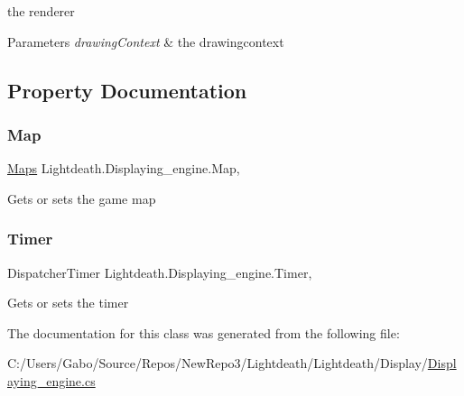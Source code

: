the renderer 


\begin{DoxyParams}{Parameters}
{\em drawing\+Context} & the drawingcontext\\
\hline
\end{DoxyParams}


\subsection{Property Documentation}
\hypertarget{class_lightdeath_1_1_displaying__engine_a914b56713dcb4b219b2f18c584c09df2}{}\label{class_lightdeath_1_1_displaying__engine_a914b56713dcb4b219b2f18c584c09df2} 
\subsubsection{\texorpdfstring{Map}{Map}}
{\footnotesize\ttfamily \hyperlink{class_lightdeath_1_1_maps}{Maps} Lightdeath.\+Displaying\+\_\+engine.\+Map\hspace{0.3cm}{\ttfamily [get]}, {\ttfamily [set]}}



Gets or sets the game map 

\hypertarget{class_lightdeath_1_1_displaying__engine_a98086ed7c5ba5e215bc77d3bf6c9c7c2}{}\label{class_lightdeath_1_1_displaying__engine_a98086ed7c5ba5e215bc77d3bf6c9c7c2} 
\subsubsection{\texorpdfstring{Timer}{Timer}}
{\footnotesize\ttfamily Dispatcher\+Timer Lightdeath.\+Displaying\+\_\+engine.\+Timer\hspace{0.3cm}{\ttfamily [get]}, {\ttfamily [set]}}



Gets or sets the timer 



The documentation for this class was generated from the following file\+:\begin{DoxyCompactItemize}
\item 
C\+:/\+Users/\+Gabo/\+Source/\+Repos/\+New\+Repo3/\+Lightdeath/\+Lightdeath/\+Display/\hyperlink{_displaying__engine_8cs}{Displaying\+\_\+engine.\+cs}\end{DoxyCompactItemize}
